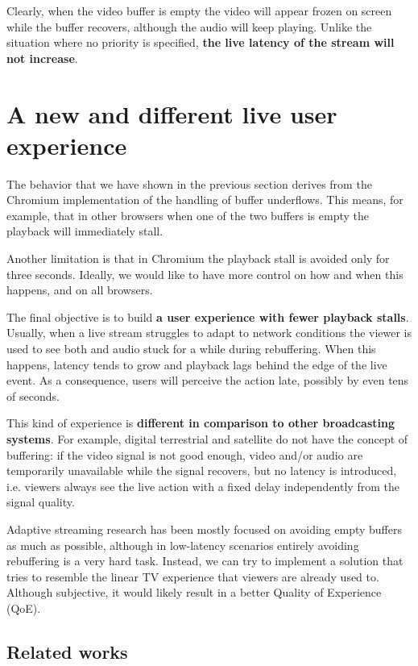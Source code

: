 Clearly, when the video buffer is empty the video will appear frozen on screen while the buffer recovers, although the audio will keep playing. Unlike the situation where no priority is specified, \textbf{the live latency of the stream will not increase}.

\section{A new and different live user experience}
\label{sec:improvements/ux}

The behavior that we have shown in the previous section derives from the Chromium implementation of the handling of buffer underflows. This means, for example, that in other browsers when one of the two buffers is empty the playback will immediately stall.

Another limitation is that in Chromium the playback stall is avoided only for three seconds. Ideally, we would like to have more control on how and when this happens, and on all browsers.

The final objective is to build \textbf{a user experience with fewer playback stalls}. Usually, when a live stream struggles to adapt to network conditions the viewer is used to see both and audio stuck for a while during rebuffering. When this happens, latency tends to grow and playback lags behind the edge of the live event. As a consequence, users will perceive the action late, possibly by even tens of seconds.

This kind of experience is \textbf{different in comparison to other broadcasting systems}. For example, digital terrestrial and satellite do not have the concept of buffering: if the video signal is not good enough, video and/or audio are temporarily unavailable while the signal recovers, but no latency is introduced, i.e. viewers always see the live action with a fixed delay independently from the signal quality.

Adaptive streaming research has been mostly focused on avoiding empty buffers as much as possible, although in low-latency scenarios entirely avoiding rebuffering is a very hard task. Instead, we can try to implement a solution that tries to resemble the linear TV experience that viewers are already used to. Although subjective, it would likely result in a better Quality of Experience (QoE).

\subsection{Related works}
\label{sec:improvements/ux/related}

